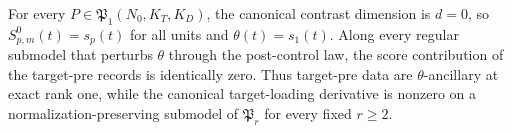 For every \(P\in\mathfrak P_1(N_0,K_T,K_D)\), the canonical contrast dimension is \(d=0\), so \(S^0_{p,m}(t)=s_p(t)\) for all units and \(\theta(t)=s_1(t)\). Along every regular submodel that perturbs \(\theta\) through the post-control law, the score contribution of the target-pre records is identically zero. Thus target-pre data are \(\theta\)-ancillary at exact rank one, while the canonical target-loading derivative is nonzero on a normalization-preserving submodel of \(\mathfrak P_r\) for every fixed \(r\ge2\).